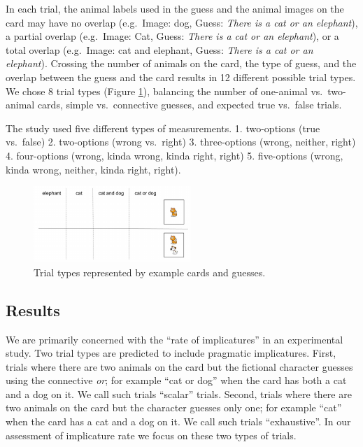 \documentclass[floatsintext,man]{apa6}
\theoremstyle{definition}
\theoremstyle{definition}
\theoremstyle{definition}
\theoremstyle{remark}
\begin{document}
In each trial, the animal labels used in the guess and the animal images
on the card may have no overlap (e.g.~Image: dog, Guess: \emph{There is
a cat or an elephant}), a partial overlap (e.g.~Image: Cat, Guess:
\emph{There is a cat or an elephant}), or a total overlap (e.g.~Image:
cat and elephant, Guess: \emph{There is a cat or an elephant}). Crossing
the number of animals on the card, the type of guess, and the overlap
between the guess and the card results in 12 different possible trial
types. We chose 8 trial types (Figure \ref{fig:trials}), balancing the
number of one-animal vs.~two-animal cards, simple vs.~connective
guesses, and expected true vs.~false trials.

The study used five different types of measurements. 1. two-options
(true vs.~false) 2. two-options (wrong vs.~right) 3. three-options
(wrong, neither, right) 4. four-options (wrong, kinda wrong, kinda
right, right) 5. five-options (wrong, kinda wrong, neither, kinda right,
right).

\begin{figure}[t]

{\centering \includegraphics{writeup_files/figure-latex/trials-1} 

}

\caption{Trial types represented by example cards and guesses.}\label{fig:trials}
\end{figure}

\subsection{Results}\label{results}

We are primarily concerned with the \enquote{rate of implicatures} in an
experimental study. Two trial types are predicted to include pragmatic
implicatures. First, trials where there are two animals on the card but
the fictional character guesses using the connective \emph{or}; for
example \enquote{cat or dog} when the card has both a cat and a dog on
it. We call such trials \enquote{scalar} trials. Second, trials where
there are two animals on the card but the character guesses only one;
for example \enquote{cat} when the card has a cat and a dog on it. We
call such trials \enquote{exhaustive}. In our assessment of implicature
rate we focus on these two types of trials.
\end{document}
